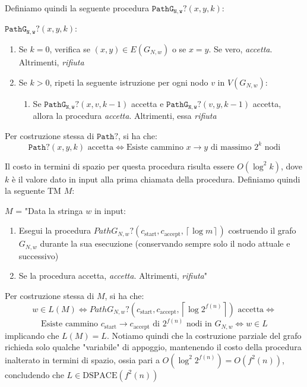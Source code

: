 \documentclass[12pt,a4paper]{report}
\theoremstyle{definition}
\newcommand{\ceil}[1]{\left\lceil#1\right\rceil}
\begin{document}
        Definiamo quindi la seguente procedura $\mathtt{PathG_{N,w}?}(x,y,k)$:

        $\mathtt{PathG_{N,w}?}(x,y,k)$:

        \begin{enumerate}[label={\arabic*.}]
            \item Se $k = 0$, verifica se $(x,y) \in E(G_{N,w})$ o se $x=y$. Se vero, \textit{accetta}. Altrimenti, \textit{rifiuta}
            \item Se $k > 0$, ripeti la seguente istruzione per ogni nodo $v$ in $V(G_{N,w})$:
            \begin{enumerate}[label={\arabic*.}, start=3]
                \item Se $\mathtt{PathG_{N,w}?}(x,v,k-1)$ accetta e $\mathtt{PathG_{N,w}?}(v,y,k-1)$ accetta, allora la procedura \textit{accetta}. Altrimenti, essa \textit{rifiuta}
            \end{enumerate}
        \end{enumerate}

        Per costruzione stessa di $\mathtt{Path?}$, si ha che:
        \[\mathtt{Path?}(x,y,k) \text{ accetta} \iff \text{Esiste cammino $x \to y$ di massimo $2^k$ nodi}\]

        Il costo in termini di spazio per questa procedura risulta essere $O(\log^2 k)$, dove $k$ è il valore dato in input alla prima chiamata della procedura. Definiamo quindi la seguente TM $M$:
        
        $M$ = "Data la stringa $w$ in input:
        \begin{enumerate}
            \item Esegui la procedura $PathG_{N,w}?(c_\mathrm{start}, c_\mathrm{accept}, \ceil{\log m})$ costruendo il grafo $G_{N,w}$ durante la sua esecuzione (conservando sempre solo il nodo attuale e successivo)
            \item Se la procedura accetta, \textit{accetta}. Altrimenti, \textit{rifiuta}"
        \end{enumerate}

        Per costruzione stessa di $M$, si ha che:
        \[w \in L(M) \iff PathG_{N,w}?(c_\mathrm{start}, c_\mathrm{accept}, \ceil{\log 2^{f(n)}}) \text{ accetta} \iff\]
        \[\text{Esiste cammino } c_\mathrm{start} \to c_\mathrm{accept} \text{ di $2^{f(n)}$ nodi in } G_{N,w} \iff w \in L\]
        implicando che $L(M) = L$. Notiamo quindi che la costruzione parziale del grafo richieda solo qualche "variabile" di appoggio, mantenendo il costo della procedura inalterato in termini di spazio, ossia pari a $O(\log^2 2^{f(n)}) = O(f^2(n))$, concludendo che $L \in \mathrm{DSPACE}(f^2(n))$
\end{document}
